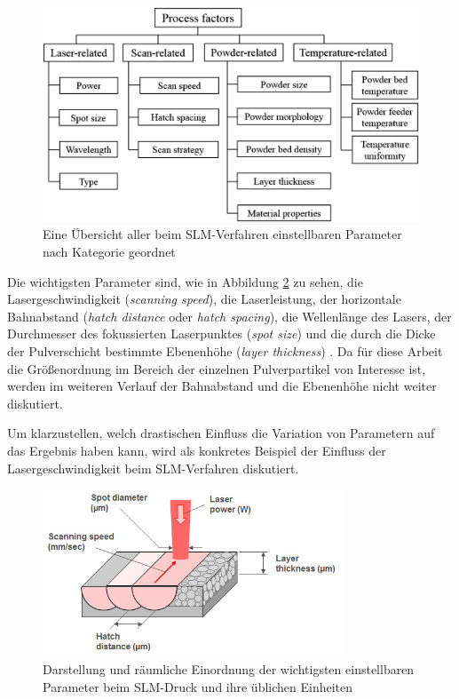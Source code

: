 		\begin{figure}[!ht]
			\centering
			\includegraphics[width=\textwidth]{chapter/main/img/scheme_parameters_2.png}
			\caption{Eine Übersicht aller beim SLM-Verfahren einstellbaren Parameter nach
			Kategorie geordnet \cite{zhang2017defect,aboulkhair2014reducing}}
			\label{fig:scheme_parameters}
		\end{figure}

		Die wichtigsten Parameter sind, wie in Abbildung \ref{fig:slm_parameters} zu sehen, die
		Lasergeschwindigkeit (\emph{scanning speed}), die Laserleistung, der horizontale
		Bahnabstand (\emph{hatch distance} oder \emph{hatch spacing}), die Wellenlänge des Lasers,
		der Durchmesser des fokussierten Laserpunktes (\emph{spot size}) und die durch die Dicke
		der Pulverschicht bestimmte Ebenenhöhe (\emph{layer thickness})
		\cite{sadali2020influence}. Da für diese Arbeit die Größenordnung im Bereich der einzelnen
		Pulverpartikel von Interesse ist, werden im weiteren Verlauf der Bahnabstand und die
		Ebenenhöhe nicht weiter diskutiert.

		Um klarzustellen, welch drastischen Einfluss die Variation von Parametern auf das Ergebnis
		haben kann, wird als konkretes Beispiel der Einfluss der Lasergeschwindigkeit beim
		SLM-Verfahren diskutiert.


		\begin{figure}[!ht]
			\centering
			\includegraphics[width=0.8\textwidth]{chapter/main/img/slm_parameters.jpg}
			\caption{Darstellung und räumliche Einordnung der wichtigsten einstellbaren Parameter
			beim SLM-Druck und ihre üblichen Einheiten \cite{saunders2017x}}
			\label{fig:slm_parameters}
		\end{figure}


